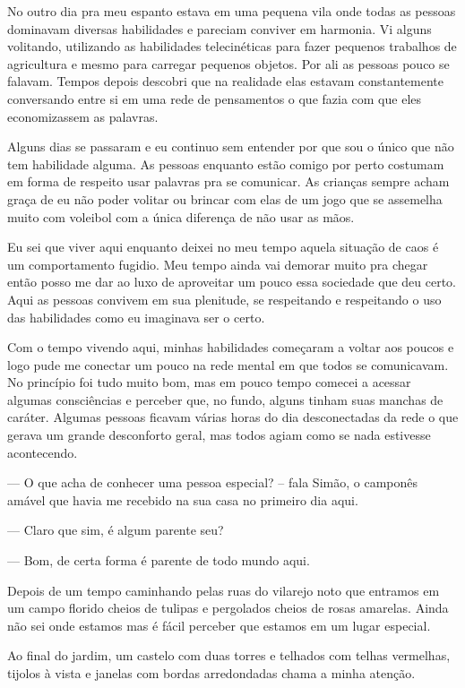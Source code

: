 No outro dia pra meu espanto estava em uma pequena vila onde todas as pessoas dominavam diversas habilidades e pareciam conviver em harmonia. Vi alguns volitando, utilizando as habilidades telecinéticas para fazer pequenos trabalhos de agricultura e mesmo para carregar pequenos objetos. Por ali as pessoas pouco se falavam. Tempos depois descobri que na realidade elas estavam constantemente conversando entre si em uma rede de pensamentos o que fazia com que eles economizassem as palavras.

Alguns dias se passaram e eu continuo sem entender por que sou o único que não tem habilidade alguma. As pessoas enquanto estão comigo por perto costumam em forma de respeito usar palavras pra se comunicar. As crianças sempre acham graça de eu não poder volitar ou brincar com elas de um jogo que se assemelha muito com voleibol com a única diferença de não usar as mãos.

Eu sei que viver aqui enquanto deixei no meu tempo aquela situação de caos é um comportamento fugidio. Meu tempo ainda vai demorar muito pra chegar então posso me dar ao luxo de aproveitar um pouco essa sociedade que deu certo. Aqui as pessoas convivem em sua plenitude, se respeitando e respeitando o uso das habilidades como eu imaginava ser o certo.

Com o tempo vivendo aqui, minhas habilidades começaram a voltar aos poucos e logo pude me conectar um pouco na rede mental em que todos se comunicavam. No princípio foi tudo muito bom, mas em pouco tempo comecei a acessar algumas consciências e perceber que, no fundo, alguns tinham suas manchas de caráter. Algumas pessoas ficavam várias horas do dia desconectadas da rede o que gerava um grande desconforto geral, mas todos agiam como se nada estivesse acontecendo.

— O que acha de conhecer uma pessoa especial? -- fala Simão, o camponês amável que havia me recebido na sua casa no primeiro dia aqui.  

— Claro que sim, é algum parente seu?

— Bom, de certa forma é parente de todo mundo aqui.

Depois de um tempo caminhando pelas ruas do vilarejo noto que entramos em um campo florido cheios de tulipas e pergolados cheios de rosas amarelas. Ainda não sei onde estamos mas é fácil perceber que estamos em um lugar especial.

Ao final do jardim, um castelo com duas torres e telhados com telhas vermelhas, tijolos à vista e janelas com bordas arredondadas chama a minha atenção.

